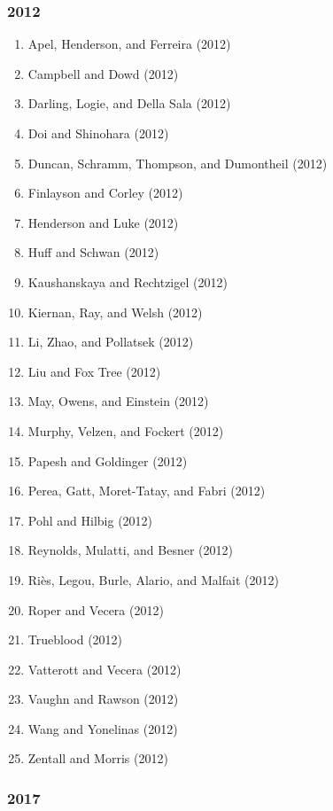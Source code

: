 \documentclass[english,man]{apa6}
\providecommand{\tightlist}{%
  \setlength{\itemsep}{0pt}\setlength{\parskip}{0pt}}
\begin{document}
\subsubsection{2012}\label{section-44}

\begin{enumerate}
\def\labelenumi{\arabic{enumi})}
\tightlist
\item
  Apel, Henderson, and Ferreira (2012)
\item
  Campbell and Dowd (2012)
\item
  Darling, Logie, and Della Sala (2012)
\item
  Doi and Shinohara (2012)
\item
  Duncan, Schramm, Thompson, and Dumontheil (2012)
\item
  Finlayson and Corley (2012)
\item
  Henderson and Luke (2012)
\item
  Huff and Schwan (2012)
\item
  Kaushanskaya and Rechtzigel (2012)
\item
  Kiernan, Ray, and Welsh (2012)
\item
  Li, Zhao, and Pollatsek (2012)
\item
  Liu and Fox Tree (2012)
\item
  May, Owens, and Einstein (2012)
\item
  Murphy, Velzen, and Fockert (2012)
\item
  Papesh and Goldinger (2012)
\item
  Perea, Gatt, Moret-Tatay, and Fabri (2012)
\item
  Pohl and Hilbig (2012)
\item
  Reynolds, Mulatti, and Besner (2012)
\item
  Riès, Legou, Burle, Alario, and Malfait (2012)
\item
  Roper and Vecera (2012)
\item
  Trueblood (2012)
\item
  Vatterott and Vecera (2012)
\item
  Vaughn and Rawson (2012)
\item
  Wang and Yonelinas (2012)
\item
  Zentall and Morris (2012)
\end{enumerate}

\subsubsection{2017}\label{section-45}
\end{document}
